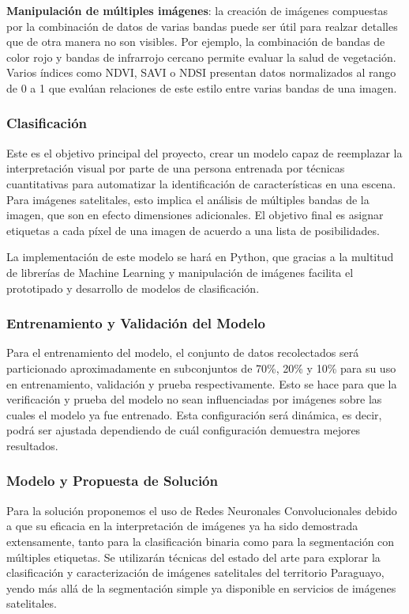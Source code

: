 {\bf Manipulación de múltiples imágenes}: la creación de imágenes compuestas por la combinación de datos de varias
bandas puede ser útil para realzar detalles que de otra manera no son visibles. Por ejemplo, la combinación de bandas
de color rojo y bandas de infrarrojo cercano permite evaluar la salud de vegetación. Varios índices como NDVI, SAVI o
NDSI presentan datos normalizados al rango de 0 a 1 que evalúan relaciones de este estilo entre varias bandas de una
imagen. \autocite{lillesand-remote-sensing}

\subsubsection{Clasificación}

Este es el objetivo principal del proyecto, crear un modelo capaz de reemplazar la interpretación visual por parte de
una persona entrenada por técnicas cuantitativas para automatizar la identificación de características en una escena.
Para imágenes satelitales, esto implica el análisis de múltiples bandas de la imagen, que son en efecto dimensiones
adicionales. El objetivo final es asignar etiquetas a cada píxel de una imagen de acuerdo a una lista de posibilidades.
\autocite{lillesand-remote-sensing}

La implementación de este modelo se hará en Python, que gracias a la multitud de librerías de Machine Learning y
manipulación de imágenes facilita el prototipado y desarrollo de modelos de clasificación.

\subsubsection{Entrenamiento y Validación del Modelo}

Para el entrenamiento del modelo, el conjunto de datos recolectados será particionado aproximadamente en subconjuntos
de 70\%, 20\% y 10\% para su uso en entrenamiento, validación y prueba respectivamente. Esto se hace para que la
verificación y prueba del modelo no sean influenciadas por imágenes sobre las cuales el modelo ya fue entrenado. Esta
configuración será dinámica, es decir, podrá ser ajustada dependiendo de cuál configuración demuestra mejores
resultados.

\subsubsection{Modelo y Propuesta de Solución}

Para la solución proponemos el uso de Redes Neuronales Convolucionales debido a que su eficacia en la interpretación de
imágenes ya ha sido demostrada extensamente, tanto para la clasificación binaria como para la segmentación con
múltiples etiquetas. Se utilizarán técnicas del estado del arte para explorar la clasificación y caracterización de
imágenes satelitales del territorio Paraguayo, yendo más allá de la segmentación simple ya disponible en servicios de
imágenes satelitales.

